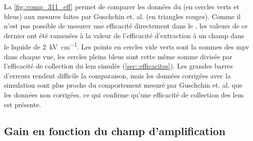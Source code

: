       La \autoref{fig::comp_311_eff} permet de comparer les données du \TOO{} (en cercles verts et bleus) aux mesures faites par Guschchin et. al.\cite{guschin} (en triangles rouges). Comme il n'est pas possible de mesurer une efficacité directement dans le \TOO{}, les valeurs de ce dernier ont été ramenées à la valeur de l'efficacité d'extraction à un champ dans le liquide de \SI{2}{\kilo\volt\per\centi\meter}. Les points en cercles vide verts sont la sommes des \gls{mpv} dans chaque vue, les cercles pleins bleus sont cette même somme divisée par l'efficacité de collection du \gls{lem} simulée (\autoref{sec::efficacites}). Les grandes barres d'erreurs rendent difficile la comparaison, mais les données corrigées avec la simulation sont plus proche du comportement mesuré par Guschchin et. al. que les données non corrigées, ce qui confirme qu'une efficacité de collection des \gls{lem} est présente.

    \subsection{Gain en fonction du champ d'amplification}\label{sec::result_gain}

